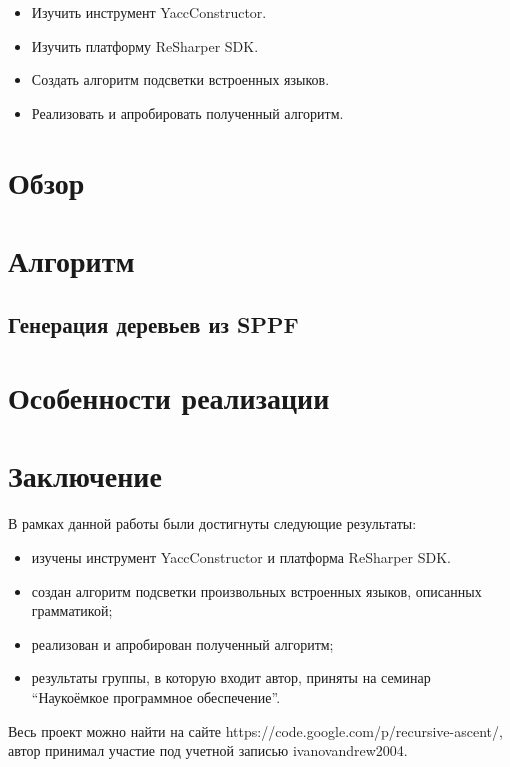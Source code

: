 \documentclass{matmex-diploma-custom}
\begin{document}
\begin{itemize}
\item Изучить инструмент YaccConstructor.
\item Изучить платформу ReSharper SDK.
\item Создать алгоритм подсветки встроенных языков.
\item Реализовать и апробировать полученный алгоритм. 
\end{itemize}

\section{Обзор}


\section{Алгоритм}


\subsection{Генерация деревьев из SPPF}



\section{Особенности реализации}



\section*{Заключение}

В рамках данной работы были достигнуты следующие результаты:
\begin{itemize}
\item изучены инструмент YaccConstructor и платформа ReSharper SDK.
\item создан алгоритм подсветки произвольных встроенных языков, описанных грамматикой;
\item реализован и апробирован полученный алгоритм;
\item результаты группы, в которую входит автор, приняты на семинар “Наукоёмкое программное обеспечение”.
\end{itemize}

Весь проект можно найти на сайте https://code.google.com/p/recursive-ascent/, автор
принимал участие под учетной записью ivanovandrew2004.
\end{document}
